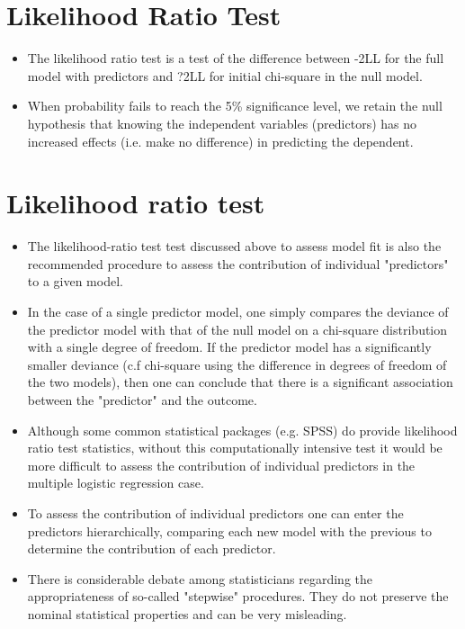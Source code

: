 ﻿\documentclass[a4paper,12pt]{article}
\begin{document}


\section{Likelihood Ratio Test}
\begin{itemize}
	\item The likelihood ratio test is a test of the difference between -2LL for the full
	model with predictors and ?2LL for initial chi-square in the null model.
	\item When probability fails to reach the 5\% significance level, we retain the null hypothesis
	that knowing the independent variables (predictors) has no increased effects (i.e. make no
	difference) in predicting the dependent.
\end{itemize}



\section{Likelihood ratio test}
\begin{itemize}
	\item The likelihood-ratio test test discussed above to assess model fit is also the recommended procedure to assess the contribution of individual "predictors" to a given model.
	
	\item In the case of a single predictor model, one simply compares the deviance of the predictor model with that of the null model on a chi-square distribution with a single degree of freedom. If the predictor model has a significantly smaller deviance (c.f chi-square using the difference in degrees of freedom of the two models), then one can conclude that there is a significant association between the "predictor" and the outcome. 
	\item Although some common statistical packages (e.g. SPSS) do provide likelihood ratio test statistics, without this computationally intensive test it would be more difficult to assess the contribution of individual predictors in the multiple logistic regression case. 
	\item To assess the contribution of individual predictors one can enter the predictors hierarchically, comparing each new model with the previous to determine the contribution of each predictor.
	\item There is considerable debate among statisticians regarding the appropriateness of so-called "stepwise" procedures. They do not preserve the nominal statistical properties and can be very misleading.
\end{itemize}
\end{document}
